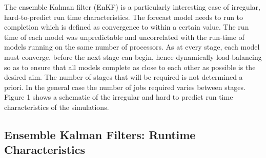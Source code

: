 \documentclass{sig-alternate}
\begin{document}
The ensemble Kalman filter (EnKF) is a particularly interesting case
of irregular, hard-to-predict run time characteristics.  The forecast
model needs to run to completion which is defined as convergence to
within a certain value.  The run time of each model was unpredictable
and uncorrelated with the run-time of models running on the same
number of processors.  As at every stage, each model must converge,
before the next stage can begin, hence dynamically load-balancing so
as to ensure that all models complete as close to each other as
possible is the desired aim.  The number of stages that will be
required is not determined a priori. In the general case the number of
jobs required varies between stages.  Figure 1 shows a schematic of
the irregular and hard to predict run time characteristics of the
simulations.

\subsection{Ensemble Kalman Filters: Runtime Characteristics}


\end{document}
